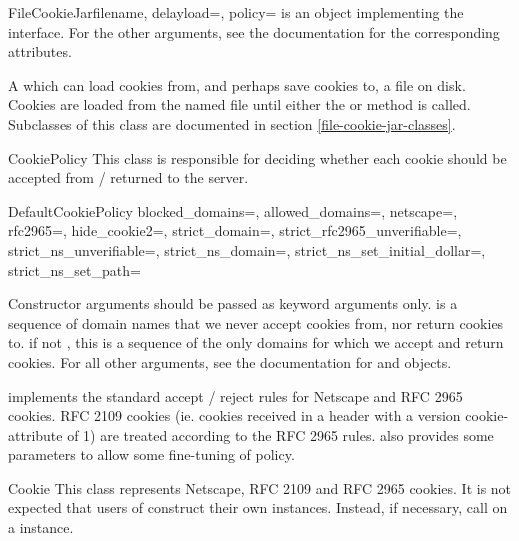 \begin{classdesc}{FileCookieJar}{filename, delayload=,
 policy=}
 is an object implementing the 
interface.  For the other arguments, see the documentation for the
corresponding attributes.

A  which can load cookies from, and perhaps save
cookies to, a file on disk.  Cookies are  loaded from the
named file until either the  or 
method is called.  Subclasses of this class are documented in section
\ref{file-cookie-jar-classes}.
\end{classdesc}

\begin{classdesc}{CookiePolicy}{}
This class is responsible for deciding whether each cookie should be
accepted from / returned to the server.
\end{classdesc}

\begin{classdesc}{DefaultCookiePolicy}{
    blocked_domains=,
    allowed_domains=,
    netscape=, rfc2965=,
    hide_cookie2=,
    strict_domain=,
    strict_rfc2965_unverifiable=,
    strict_ns_unverifiable=,
    strict_ns_domain=,
    strict_ns_set_initial_dollar=,
    strict_ns_set_path=
  }

Constructor arguments should be passed as keyword arguments only.
 is a sequence of domain names that we never
accept cookies from, nor return cookies to.  if
not , this is a sequence of the only domains for which
we accept and return cookies.  For all other arguments, see the
documentation for  and 
objects.

 implements the standard accept / reject
rules for Netscape and RFC 2965 cookies.  RFC 2109 cookies
(ie. cookies received in a  header with a
version cookie-attribute of 1) are treated according to the RFC 2965
rules.   also provides some parameters to
allow some fine-tuning of policy.
\end{classdesc}

\begin{classdesc}{Cookie}{}
This class represents Netscape, RFC 2109 and RFC 2965 cookies.  It is
not expected that users of  construct their own
 instances.  Instead, if necessary, call
 on a  instance.
\end{classdesc}

